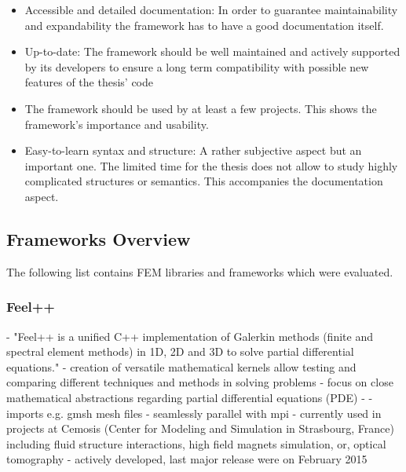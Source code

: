 \begin{itemize}
 \item Accessible and detailed documentation: In order to guarantee maintainability and expandability the framework has to have a good documentation itself. %
 \item Up-to-date: The framework should be well maintained and actively supported by its developers to ensure a long term compatibility with possible new features of the thesis' code
 \item The framework should be used by at least a few projects. This shows the framework's importance and usability. %
 \item Easy-to-learn syntax and structure: A rather subjective aspect but an important one. The limited time for the thesis does not allow to study highly complicated structures or semantics. This accompanies the documentation aspect.
 \end{itemize}
 \subsection{Frameworks Overview}
 The following list contains FEM libraries and frameworks which were evaluated.
  \subsubsection{Feel++}
  - "Feel++ is a unified C++ implementation of Galerkin methods (finite and spectral element methods) in 1D, 2D and 3D to solve partial differential equations."\cite{feelpp}\newline
  - creation of versatile mathematical kernels allow testing and comparing different techniques and methods in solving problems\newline
  - focus on close mathematical abstractions regarding partial differential equations (PDE)\newline
  - \cite{prud2012feel++}
  - imports e.g. gmsh mesh files\newline
  - seamlessly parallel with mpi\newline
  - currently used in projects at Cemosis (Center for Modeling and Simulation in Strasbourg, France) including fluid structure interactions, high field magnets simulation, or, optical tomography\newline
  - actively developed, last major release were on February 2015
